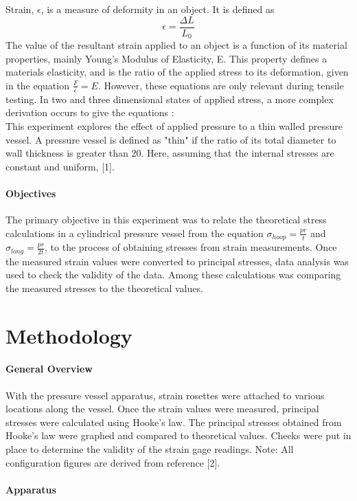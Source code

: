 \documentclass[12pt]{article}
\begin{document}
Strain, $\epsilon$, is a measure of deformity in an object. It is defined as 
$$ \epsilon = \frac {\Delta L}{L_0}$$
The value of the resultant strain applied to an object is a function of its material properties, mainly
Young's Modulus of Elasticity, E. This property defines a materials elasticity, and is the ratio of the 
applied stress to its deformation, given in the equation $ \frac{F}{\epsilon} = E  $. However, these equations
are only relevant during tensile testing. In two and three dimensional states of applied stress, a more 
complex derivation occurs to give the equations :  \\
This experiment explores the effect of applied pressure to a thin walled pressure vessel. A pressure 
vessel is defined as "thin" if the ratio of its total diameter to wall thickness is greater than 20. Here, assuming that the 
internal stresses are constant and uniform,   [1].

\paragraph{Objectives}
The primary objective in this experiment was to relate the theoretical stress calculations in a cylindrical
pressure vessel from the equation $\sigma_{hoop} = \frac{pr}{t} $  and  $\sigma_{long} = \frac{pr}{2t} $, to the
process of obtaining stresses from strain measurements. 
Once the measured strain values were converted to principal stresses, data analysis was used to 
check the validity of the data. Among these calculations was comparing the measured stresses to 
the theoretical values. 

\newpage
\section{Methodology}
\paragraph{General Overview} 
With the pressure vessel apparatus, strain rosettes were attached to various locations along the vessel. 
Once the strain values were measured, principal stresses were calculated using Hooke's law. The 
principal stresses obtained from Hooke's law were graphed and compared to theoretical
values. Checks were put in place to determine the validity of the strain gage readings. Note: All configuration 
figures are derived from reference [2]. 

\paragraph {Apparatus}
\end{document}
